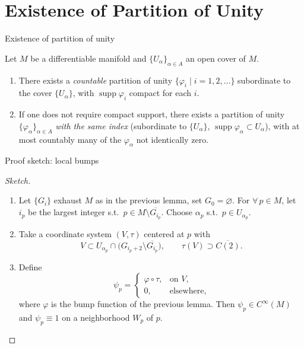 \documentclass[10pt]{beamer}
\newcommand{\supp}{\operatorname{supp}}
\begin{document}
\section{Existence of Partition of Unity}

\begin{frame}{Existence of partition of unity}
	\begin{theorem}
		Let $M$ be a differentiable manifold and
		$\{U_\alpha\}_{\alpha \in A}$ an open cover of $M$.
		\begin{enumerate}
			\item There exists a \emph{countable} partition of unity
			      $\{\varphi_i \mid i = 1, 2, \dots\}$ subordinate to the
			      cover $\{U_\alpha\}$, with $\supp \varphi_i$ compact for
			      each $i$.
			\item If one does not require compact support, there exists a
			      partition of unity $\{\varphi_\alpha\}_{\alpha \in A}$
			      \emph{with the same index} (subordinate to
			      $\{U_\alpha\}$, $\supp \varphi_\alpha \subset U_\alpha$),
			      with at most countably many of the $\varphi_\alpha$ not
			      identically zero.
		\end{enumerate}
	\end{theorem}
\end{frame}

\begin{frame}{Proof sketch: local bumps}
	\begin{proof}[Sketch]
		\begin{enumerate}
			\item Let $\{G_i\}$ exhaust $M$ as in the previous lemma, set
			      $G_0 = \varnothing$. For $\forall\, p \in M$, let $i_p$ be
			      the largest integer s.t.\
			      $p \in M \setminus \overline{G_{i_p}}$. Choose
			      $\alpha_p$ s.t.\ $p \in U_{\alpha_p}$.
			\item Take a coordinate system $(V, \tau)$ centered at $p$ with
			      \[
				      V \subset U_{\alpha_p} \cap
				      \bigl( G_{i_p+2} \setminus \overline{G_{i_p}} \bigr),
				      \qquad \tau(V) \supset \overline{C(2)} .
			      \]
			\item Define
			      \[
				      \psi_p = \begin{cases} \varphi \circ \tau, & \text{on } V, \\ 0, & \text{elsewhere}, \end{cases}
			      \]
			      where $\varphi$ is the bump function of the previous
			      lemma. Then $\psi_p \in C^\infty(M)$ and $\psi_p \equiv 1$
			      on a neighborhood $W_p$ of $p$.
		\end{enumerate}
	\end{proof}
\end{frame}
\end{document}
